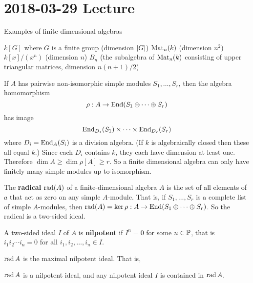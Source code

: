 \section{2018-03-29 Lecture}

\begin{exam}
	Examples of finite dimensional algebras
    \begin{enum}
    	\io $k[G]$ where $G$ is a finite group (dimension $\left\lvert G \right\rvert$)
        \io $\operatorname{Mat}_n(k)$ (dimension $n^2$)
        \io $k[x]/(x^n)$ (dimension $n$)
        \io $B_n$ (the subalgebra of $\operatorname{Mat}_n(k)$ consisting of upper triangular matrices, dimension $n(n+1)/2$)
    \end{enum}
\end{exam}

\begin{cor}\label{cor:density}
	If $A$ has pairwise non-isomorphic simple modules $S_1,\ldots,S_r$, then the algebra homomorphism
    \[\rho:A \to \operatorname{End}(S_1 \oplus \cdots \oplus S_r)\]
    has image
    \[\operatorname{End}_{D_1}(S_1) \times \cdots \times \operatorname{End}_{D_r}(S_r)\]
    where $D_i = \operatorname{End}_A(S_i)$ is a division algebra.
    (If $k$ is algebraically closed then these all equal $k$.)
    Since each $D_i$ contains $k$, they each have dimension at least one.
    Therefore $\dim A \geq \dim \rho[A] \geq r$.
    So a finite dimensional algebra can only have finitely many simple modules up to isomorphism.
\end{cor}

\begin{defn}
	The \textbf{radical} $\operatorname{rad}(A)$ of a finite-dimensional algebra $A$ is the set of all elements of $a$ that act as zero on any simple $A$-module.
    That is, if $S_1,\ldots,S_r$ is a complete list of simple $A$-modules, then $\operatorname{rad}(A) = \ker \rho: A \to \operatorname{End}(S_1 \oplus \cdots \oplus S_r)$.
    So the radical is a two-sided ideal.
\end{defn}

\begin{defn}
	A two-sided ideal $I$ of $A$ is \textbf{nilpotent} if $I^n=0$ for some $n \in \mathbb{P}$, that is $i_1i_2\cdots i_n=0$ for all $i_1,i_2,\ldots,i_n \in I$.
\end{defn}

\begin{prop}
	$\operatorname{rad} A$ is the maximal nilpotent ideal.
    That is,
    \begin{enum}
    	\io $\operatorname{rad} A$ is a nilpotent ideal, and
        \io any nilpotent ideal $I$ is contained in $\operatorname{rad} A$.
    \end{enum}
\end{prop}


